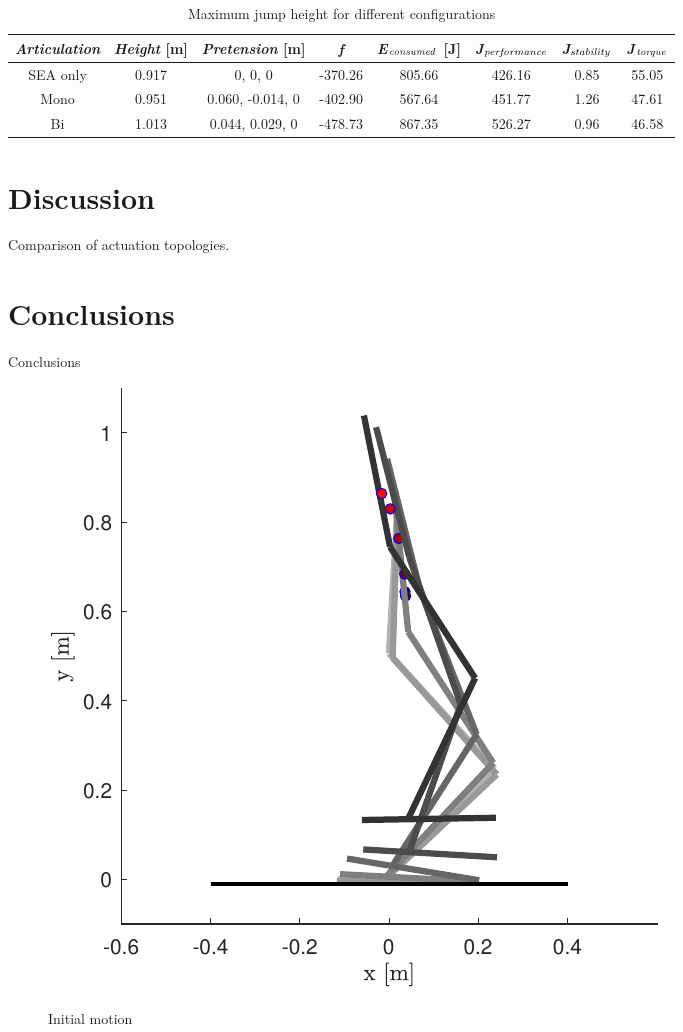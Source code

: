 \documentclass[letterpaper, 10 pt, conference]{ieeeconf}  %
\begin{document}
\begin{table}[ht]
	\caption{Maximum jump height for different configurations}
	\label{maxheight}
	\begin{center}
		\begin{tabular}[t]{c||c|c|c|c|c|c|c}
			\textit{Articulation}	& \textit{Height} [m] & \textit{Pretension} [m] & \textit{f} & \textit{E}$_{\text{\textit{consumed}}}$ [J] & \textit{J}$_{\text{\textit{performance}}}$ & \textit{J}$_{\text{\textit{stability}}}$ & \textit{J}$_{\text{\textit{torque}}}$\\ 
			\hline
			SEA only& 0.917 & 0, 0, 0 &-370.26  & 805.66 & 426.16  &0.85  &   55.05\\
			\hline
			Mono &0.951 & 0.060, -0.014, 0  & -402.90 & 567.64& 451.77 & 1.26 &47.61 \\
			\hline
			Bi &1.013 & 0.044, 0.029, 0 & -478.73 & 867.35 & 526.27 & 0.96 & 46.58
		\end{tabular}
	\end{center}
\end{table}


\section{Discussion} \label{sec:discussion}

Comparison of actuation topologies.

\section{Conclusions} \label{sec:conclusions} 

Conclusions

  \begin{figure}[b]
	\centering
	{\includegraphics[scale=0.5]{initialguess}
	}%
	
	\caption{Initial motion} \label{fig:seq}
	
\end{figure}
\end{document}

